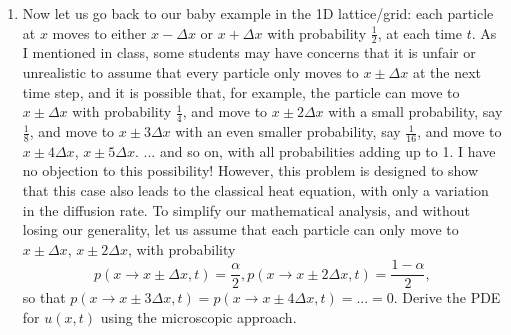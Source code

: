 \documentclass[6pt]{article}
\numberwithin{equation}{section}
\begin{document}
\begin{enumerate}
(iii) Now let us return to the same problem with $\Delta x=\Delta t=1$ and the same initial condition $u(x,0)=(4-x^2)^+$, but now over the finite interval $(-5,5)$.  We are well set for $u(x,1)$ at all $x$ except $x=\pm 5$, because $x=\pm6$ is not considered in this finite interval.  Therefore, we need to set special conditions for $u(\pm5,t)$ for some time $t$ in order to calculate $u(\pm4,t+1)$, and so on.  This condition is called a boundary condition and must be set for any PDE over a finite interval.  One type is the so-called Dirichlet boundary condition for which we set $u(\pm5,t)=0$ (or some other constant) for any $t>0$.  Suppose $u(\pm5,t)=0$ for all $t\geq0$. Plot $u(x,t)$ for $x=\pm5,...,\pm1,0$ at time $t=0,1,...,6$ and connect the neighboring points with straight lines.

(iv)  do the same as in (iii) with $u(\pm 5,t)=2$ for any $t>0$;

(v)  do the same as in (iii) with $u(-5,t)=1$ and $u(5,t)=3$ for any $t>0$.  Now you can see that different boundary conditions can have different effects on the solution's behavior;

(vi)  do the same as in (iii) with $u(-5,t)=1$ and $u(5,t)=3$ for any $t>0$, but $u_0(x)=(x^2-4)^+$.  Now you can see that different initial conditions can have different effects on the solution's behavior;

\textbf{Note}: You can always, for your amusement but no need to show me, set $\Delta x$ and $\Delta t$ to a different size, say $10^{-3}$, to see how the discrete solution approaches the continuum solution;

\item Now let us go back to our baby example in the 1D lattice/grid: each particle at $x$ moves to either $x-\Delta x$ or $x+\Delta x$ with probability $\frac{1}{2}$, at each time $t$.  As I mentioned in class, some students may have concerns that it is unfair or unrealistic to assume that every particle only moves to $x\pm \Delta x$ at the next time step, and it is possible that, for example, the particle can move to $x\pm\Delta x$ with probability $\frac{1}{4}$, and move to $x\pm2\Delta x$ with a small probability, say $\frac{1}{8}$, and move to $x\pm3\Delta x$ with an even smaller probability, say $\frac{1}{16}$, and move to $x\pm 4\Delta x$, $x\pm 5\Delta x$. ... and so on, with all probabilities adding up to 1.  I have no objection to this possibility! However, this problem is designed to show that this case also leads to the classical heat equation, with only a variation in the diffusion rate.  To simplify our mathematical analysis, and without losing our generality, let us assume that each particle can only move to $x\pm\Delta x$, $x\pm 2\Delta x$, with probability
\[p(x\rightarrow x\pm\Delta x,t)=\frac{\alpha}{2}, p(x\rightarrow x\pm2\Delta x,t)=\frac{1-\alpha}{2},\]
so that $p(x\rightarrow x\pm3\Delta x,t)=p(x\rightarrow x\pm4\Delta x,t)=...=0$.   Derive the PDE for $u(x,t)$ using the microscopic approach.


\end{enumerate}
\end{document}
